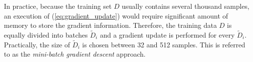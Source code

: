 %

In practice, because the training set $D$ usually contains several thousand samples, an execution of  (\ref{eq:gradient_update}) would require significant amount of memory to store the gradient information. Therefore, the training data $D$ is equally divided into batches  $\widetilde{D}_i$  and a gradient update is  performed for every $\widetilde{D}_i$. Practically,  the size of $\widetilde{D}_i$ is chosen between 32 and 512 samples. This is referred to as the \textit{mini-batch gradient descent} approach.







